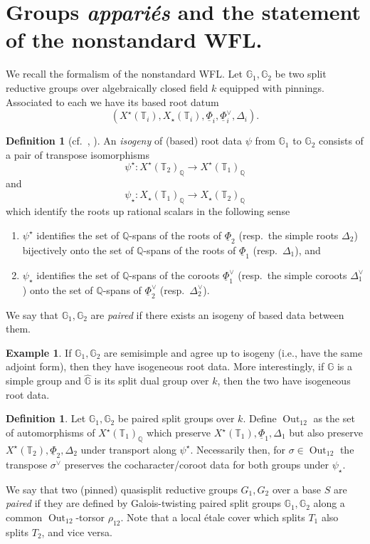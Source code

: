 \documentclass[openany]{amsbook}
\theoremstyle{definition}
\newtheorem{definition}[theorem]{Definition}
\newtheorem{example}[theorem]{Example}
\theoremstyle{remark}
\numberwithin{equation}{section}
\newcommand{\Q}{\mathbb{Q}}
\newcommand{\G}{\mathbb{G}}
\newcommand{\T}{\mathbb{T}}
\newcommand{\ul}[1]{\underline{#1}}
\renewcommand{\-}{\operatorname{-}}
\newcommand{\Out}{\operatorname{Out}}
\begin{document}
\section{Groups \textit{appari\'es} and the statement of the nonstandard WFL.}\label{subsect.nonstd.setup}

We recall the formalism of the nonstandard WFL. Let $\G_1, \G_2$ be two split reductive groups over algebraically closed field $k$ equipped with pinnings. Associated to each we have its based root datum
$$
    (X^\star(\T_i), X_\star(\T_i), \ul{\Phi}_i, \ul{\Phi}_i^\vee, \Delta_i).
$$
\begin{definition}[{cf.\ \cite[D\'efinition 1.12.1]{ngofl}, \cite[\S 3.7]{WaldTordu}}]
    An \emph{isogeny} of (based) root data $\psi$ from $\G_1$ to $\G_2$ consists of a pair of transpose isomorphisms
    $$
        \psi^\star : X^\star(\T_2)_{\Q} \to X^\star(\T_1)_{\Q}
    $$
    and
    $$
        \psi_\star : X_\star(\T_1)_{\Q} \to X_\star(\T_2)_{\Q}
    $$
    which identify the roots up rational scalars in the following sense
    \begin{enumerate}
        \item $\psi^\star$ identifies the set of $\Q$-spans of the roots of $\ul{\Phi}_2$ (resp.\ the simple roots $\Delta_2$) bijectively onto the set of $\Q$-spans of the roots of $\ul{\Phi}_1$ (resp.\  $\Delta_1$), and
        \item $\psi_\star$ identifies the set of $\Q$-spans of the coroots $\ul{\Phi}_1^\vee$ (resp.\ the simple coroots $\Delta_1^\vee$) onto the set of $\Q$-spans of $\ul{\Phi}_2^\vee$ (resp.\ $\Delta_2^\vee$).
    \end{enumerate}
    We say that $\G_1, \G_2$ are \emph{paired} if there exists an isogeny of based data between them.
\end{definition}

\begin{example}
    If $\G_1, \G_2$ are semisimple and agree up to isogeny (i.e., have the same adjoint form), then they have isogeneous root data. More interestingly, if $\G$ is a simple group and $\widehat{\G}$ is its split dual group over $k$, then the two have isogeneous root data.
\end{example}

\begin{definition}
    Let $\G_1, \G_2$ be paired split groups over $k$. Define $\Out_{12}$ as the set of automorphisms of $X^\star(\T_1)_{\Q}$ which preserve $X^\star(\T_1), \ul{\Phi}_1, \Delta_1$ but also preserve $X^\star(\T_2), \ul{\Phi}_2, \Delta_2$ under transport along $\psi^\star$. Necessarily then, for $\sigma \in \Out_{12}$ the transpose $\sigma^\vee$ preserves the cocharacter/coroot data for both groups under $\psi_\star$.

    We say that two (pinned) quasisplit reductive groups $G_1, G_2$ over a base $S$ are \emph{paired} if they are defined by Galois-twisting paired split groups $\G_1, \G_2$ along a common $\Out_{12}$-torsor $\rho_{12}$. Note that a local \'etale cover which splits $T_1$ also splits $T_2$, and vice versa.
\end{definition}
\end{document}
